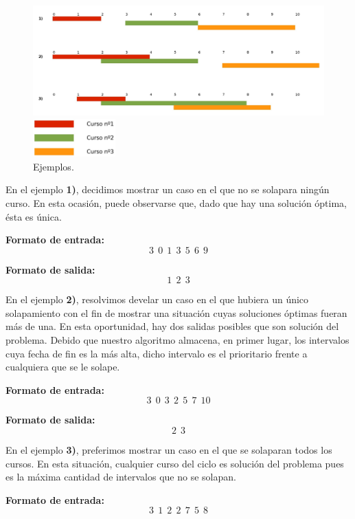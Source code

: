 \begin{figure}[H] %
\begin{center}
\includegraphics[width=480pt]{../imgs/ejemplosej2.jpg}
\end{center}
\includegraphics[width=90pt]{../imgs/leyendaejemploej2.jpg}
\caption{Ejemplos.}
\end{figure}
En el ejemplo \textbf{1)}, decidimos mostrar un caso en el que no se solapara ningún curso. En esta ocasión, puede observarse que, dado que hay una solución óptima, ésta es única.\newline

\textbf{Formato de entrada:} $$3\ \ 0\ \ 1\ \ 3\ \ 5\ \ 6\ \ 9$$

\textbf{Formato de salida:} $$1\ \ 2\ \ 3$$

En el ejemplo \textbf{2)}, resolvimos develar un caso en el que hubiera un único solapamiento con el fin de mostrar una situación cuyas soluciones óptimas fueran más de una. En esta oportunidad, hay dos salidas posibles que son solución del problema. Debido que nuestro algoritmo almacena, en primer lugar, los intervalos cuya fecha de fin es la más alta, dicho intervalo es el prioritario frente a cualquiera que se le solape.\newline

\textbf{Formato de entrada:} $$3\ \ 0\ \ 3\ \ 2\ \ 5\ \ 7\ \ 10$$

\textbf{Formato de salida:} $$2\ \ 3$$

En el ejemplo \textbf{3)}, preferimos mostrar un caso en el que se solaparan todos los cursos. En esta situación, cualquier curso del ciclo es solución del problema pues es la máxima cantidad de intervalos que no se solapan.\newline

\textbf{Formato de entrada:} $$3\ \ 1\ \ 2\ \ 2\ \ 7\ \ 5\ \ 8$$

